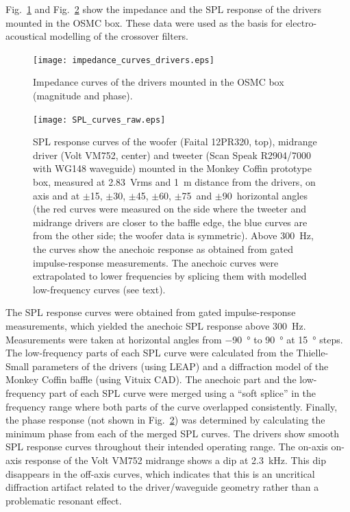 \documentclass[12pt,a4paper]{article}
\providecommand{\figr}[1]{Fig.~\ref{fig:#1}}
\providecommand{\figlabel}[1]{\label{fig:#1}}
\begin{document}
\figr{impedance_curves_drivers} and \figr{SPL_curves_raw} show the impedance and the SPL response of the drivers mounted in the OSMC box. These data were used as the basis for electro-acoustical modelling of the crossover filters.

\begin{figure}[tbp]
	\centering
	\texttt{[image: impedance\_curves\_drivers.eps]}
	\caption{Impedance curves of the drivers mounted in the OSMC box (magnitude and phase).}
	\figlabel{impedance_curves_drivers}
\end{figure}

\begin{figure}[tbp]
	\centering
	\vspace{-10ex}
	\texttt{[image: SPL\_curves\_raw.eps]}
	\caption{SPL response curves of the woofer (Faital 12PR320, top), midrange driver (Volt VM752, center) and tweeter (Scan Speak R2904/7000 with WG148 wave\-guide) mounted in the Monkey Coffin prototype box, measured at \SI{2.83}{Vrms} and \SI{1}{m} distance from the drivers, on axis and at $\pm$15\degree, $\pm$30\degree, $\pm$45\degree, $\pm$60\degree, $\pm$75\degree\ and $\pm$90\degree\ horizontal angles (the red curves were measured on the side where the tweeter and midrange drivers are closer to the baffle edge, the blue curves are from the other side; the woofer data is symmetric). Above \SI{300}{Hz}, the curves show the anechoic response as obtained from gated impulse-response measurements. The anechoic curves were extrapolated to lower frequencies by splicing them with modelled low-frequency curves (see text).}
	\figlabel{SPL_curves_raw}
\end{figure}

The SPL response curves were obtained from gated impulse-response measurements, which yielded the anechoic SPL response above \SI{300}{Hz}. Measurements were taken at horizontal angles from \SI{-90}{\degree} to \SI{+90}{\degree} at \SI{15}{\degree} steps. The low-frequency parts of each SPL curve were calculated from the Thielle-Small parameters of the drivers (using LEAP) and a diffraction model of the Monkey Coffin baffle (using Vituix CAD).\cite{osmc_p555} The anechoic part and the low-frequency part of each SPL curve were merged using a ``soft splice'' in the frequency range where both parts of the curve overlapped consistently\cite{osmc_p568}. Finally, the phase response (not shown in \figr{SPL_curves_raw}) was determined by calculating the minimum phase from each of the merged SPL curves. The drivers show smooth SPL response curves throughout their intended operating range. The on-axis on-axis response of the Volt VM752 midrange shows a dip at \SI{2.3}{kHz}. This dip disappears in the off-axis curves, which indicates that this is an uncritical diffraction artifact related to the driver/waveguide geometry rather than a problematic resonant effect.\par
\end{document}
